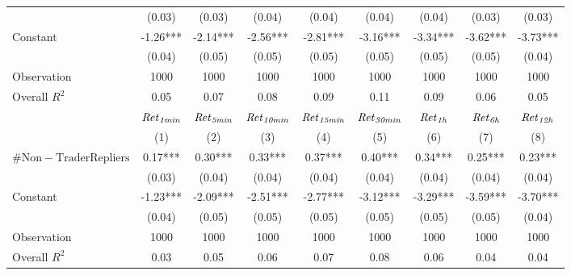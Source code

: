 \begin{tabular}{lcccccccc}
 & (0.03) & (0.03) & (0.04) & (0.04) & (0.04) & (0.04) & (0.03) & (0.03) \\
Constant & -1.26*** & -2.14*** & -2.56*** & -2.81*** & -3.16*** & -3.34*** & -3.62*** & -3.73*** \\
 & (0.04) & (0.05) & (0.05) & (0.05) & (0.05) & (0.05) & (0.05) & (0.04) \\
Observation & 1000 & 1000 & 1000 & 1000 & 1000 & 1000 & 1000 & 1000 \\
Overall $R^2$ & 0.05 & 0.07 & 0.08 & 0.09 & 0.11 & 0.09 & 0.06 & 0.05 \\
\hline
 & ${\it Ret}_{\it 1min}$ & ${\it Ret}_{\it 5min}$ & ${\it Ret}_{\it 10min}$ & ${\it Ret}_{\it 15min}$ & ${\it Ret}_{\it 30min}$ & ${\it Ret}_{\it 1h}$ & ${\it Ret}_{\it 6h}$ & ${\it Ret}_{\it 12h}$ \\
 & (1) & (2) & (3) & (4) & (5) & (6) & (7) & (8) \\
\hline
$\mathrm{\#Non-Trader Repliers}$ & 0.17*** & 0.30*** & 0.33*** & 0.37*** & 0.40*** & 0.34*** & 0.25*** & 0.23*** \\
 & (0.03) & (0.04) & (0.04) & (0.04) & (0.04) & (0.04) & (0.04) & (0.04) \\
Constant & -1.23*** & -2.09*** & -2.51*** & -2.77*** & -3.12*** & -3.29*** & -3.59*** & -3.70*** \\
 & (0.04) & (0.05) & (0.05) & (0.05) & (0.05) & (0.05) & (0.05) & (0.04) \\
Observation & 1000 & 1000 & 1000 & 1000 & 1000 & 1000 & 1000 & 1000 \\
Overall $R^2$ & 0.03 & 0.05 & 0.06 & 0.07 & 0.08 & 0.06 & 0.04 & 0.04 \\
\hline
\end{tabular}
